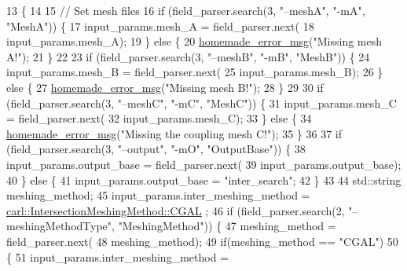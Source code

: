 \begin{DoxyCode}
13                                                     \{
14 
15     \textcolor{comment}{// Set mesh files}
16     \textcolor{keywordflow}{if} (field\_parser.search(3, \textcolor{stringliteral}{"--meshA"}, \textcolor{stringliteral}{"-mA"}, \textcolor{stringliteral}{"MeshA"})) \{
17         input\_params.mesh\_A = field\_parser.next(
18                 input\_params.mesh\_A);
19     \} \textcolor{keywordflow}{else} \{
20         \hyperlink{common__header_8h_a05d65d26b911668ac90085745dca71f6}{homemade\_error\_msg}(\textcolor{stringliteral}{"Missing mesh A!"}); 
21     \}
22 
23     \textcolor{keywordflow}{if} (field\_parser.search(3, \textcolor{stringliteral}{"--meshB"}, \textcolor{stringliteral}{"-mB"}, \textcolor{stringliteral}{"MeshB"})) \{
24         input\_params.mesh\_B = field\_parser.next(
25                 input\_params.mesh\_B);
26     \} \textcolor{keywordflow}{else} \{
27         \hyperlink{common__header_8h_a05d65d26b911668ac90085745dca71f6}{homemade\_error\_msg}(\textcolor{stringliteral}{"Missing mesh B!"}); 
28     \}
29 
30     \textcolor{keywordflow}{if} (field\_parser.search(3, \textcolor{stringliteral}{"--meshC"}, \textcolor{stringliteral}{"-mC"}, \textcolor{stringliteral}{"MeshC"})) \{
31         input\_params.mesh\_C = field\_parser.next(
32                 input\_params.mesh\_C);
33     \} \textcolor{keywordflow}{else} \{
34         \hyperlink{common__header_8h_a05d65d26b911668ac90085745dca71f6}{homemade\_error\_msg}(\textcolor{stringliteral}{"Missing the coupling mesh C!"}); 
35     \}
36 
37     \textcolor{keywordflow}{if} (field\_parser.search(3, \textcolor{stringliteral}{"--output"}, \textcolor{stringliteral}{"-mO"}, \textcolor{stringliteral}{"OutputBase"})) \{
38         input\_params.output\_base = field\_parser.next(
39                 input\_params.output\_base);
40     \} \textcolor{keywordflow}{else} \{
41         input\_params.output\_base = \textcolor{stringliteral}{"inter\_search"};
42     \}
43 
44     std::string meshing\_method;
45     input\_params.inter\_meshing\_method = \hyperlink{namespacecarl_a4f72fd25137b97ac1ca1276ec549e5cfa509162a828acac7eaad1fc369696a3b1}{carl::IntersectionMeshingMethod::CGAL}
      ;
46     \textcolor{keywordflow}{if} (field\_parser.search(2, \textcolor{stringliteral}{"--meshingMethodType"}, \textcolor{stringliteral}{"MeshingMethod"})) \{
47         meshing\_method = field\_parser.next(
48                 meshing\_method);
49         \textcolor{keywordflow}{if}(meshing\_method == \textcolor{stringliteral}{"CGAL"})
50         \{
51             input\_params.inter\_meshing\_method = 

\end{DoxyCode}
